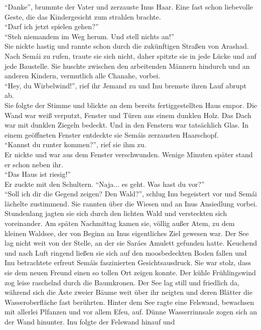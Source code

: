 \documentclass[a4paper,12pt]{book}
\begin{document}
``Danke'', brummte der Vater und zerzauste Inus Haar. Eine fast schon liebevolle Geste, die das 
Kindergesicht zum strahlen brachte. \\
``Darf ich jetzt spielen gehen?''\\
``Steh niemandem im Weg herum. Und stell nichts an!''\\
Sie nickte hastig und rannte schon durch die zukünftigen Straßen von Arashad. Nach Semái zu rufen, 
traute sie sich nicht, daher spitzte sie in jede Lücke und auf jede Baustelle. Sie huschte zwischen 
den arbeitenden Männern hindurch und an anderen Kindern, vermutlich alle Chanahe, vorbei. \\
``Hey, du Wirbelwind!'', rief ihr Jemand zu und Inu bremste ihren Lauf abrupt ab. \\
Sie folgte der Stimme und blickte an dem bereits fertiggestellten Haus empor. Die Wand war weiß 
verputzt, Fenster und Türen aus einem dunklen Holz. Das Dach war mit dunklen Ziegeln bedeckt. Und 
in den Fenstern war tatsächlich Glas. In einem geöffneten Fenster entdeckte sie Semáis zerzausten 
Haarschopf. \\
``Kannst du runter kommen?'', rief sie ihm zu. \\
Er nickte und war aus dem Fenster verschwunden. Wenige Minuten später stand er schon neben ihr. \\
``Das Haus ist riesig!''\\
Er zuckte mit den Schultern. ``Naja... es geht. Was hast du vor?''\\
``Soll ich dir die Gegend zeigen? Den Wald?'', schlug Inu begeistert vor und Semái lächelte 
zustimmend. 
Sie rannten über die Wiesen und an Inus Ansiedlung vorbei. Stundenlang jagten sie sich durch den 
lichten Wald und versteckten sich voreinander. Am späten Nachmittag kamen sie, völlig außer Atem, 
zu dem kleinen Waldsee, der von Beginn an Inus eigentliches Ziel gewesen war. Der See lag nicht 
weit von der Stelle, an der sie Saráes Amulett gefunden hatte. Keuchend und nach Luft ringend 
ließen sie sich auf den moosbedeckten Boden fallen und Inu betrachtete erfreut Semáis faszinierten 
Gesichtsausdruck. Sie war stolz, dass sie dem neuen Freund einen so tollen Ort zeigen konnte. 
Der kühle Frühlingswind zog leise raschelnd durch die Baumkronen. Der See lag still und friedlich 
da, während sich die Äste zweier Bäume weit über ihr neigten und deren Blätter die Wasseroberfläche 
fast berührten. Hinter dem See ragte eine Felswand, bewachsen mit allerlei Plfanzen und vor allem 
Efeu, auf. Dünne Wasserrinnsale zogen sich an der Wand hinunter. Inu folgte der Felswand hinauf und 
\end{document}
